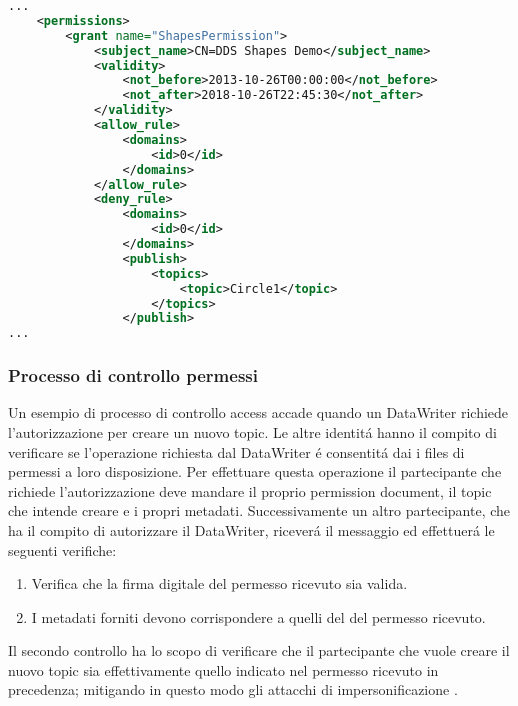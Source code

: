 \vspace{5mm} %
\begin{lstlisting}[language=XML, caption=Estratto di permissions
    document{,} tratto da documento di riferimento 
    del DDS Security versione 1.1 \cite{ddssecurity1.1}.
    , label=XML permission file,
    captionpos=b]
...
    <permissions>
        <grant name="ShapesPermission">
            <subject_name>CN=DDS Shapes Demo</subject_name>
            <validity>
                <not_before>2013-10-26T00:00:00</not_before>
                <not_after>2018-10-26T22:45:30</not_after>
            </validity>
            <allow_rule>
                <domains>
                    <id>0</id>
                </domains>
            </allow_rule>
            <deny_rule>
                <domains>
                    <id>0</id>
                </domains>
                <publish>
                    <topics>
                        <topic>Circle1</topic>
                    </topics>
                </publish>
...
    \end{lstlisting}
\vspace{5mm}

\subsubsection{Processo di controllo permessi}
Un esempio di processo di controllo access accade
quando un DataWriter richiede l'autorizzazione per creare un nuovo topic.
Le altre identitá hanno il compito di verificare se l'operazione 
richiesta dal DataWriter é consentitá
dai i files di permessi a loro disposizione. Per effettuare 
questa operazione il partecipante che richiede l'autorizzazione 
deve mandare il proprio permission document, il topic che intende creare e 
i propri metadati. Successivamente un altro partecipante,
che ha il compito di autorizzare il DataWriter,
riceverá il messaggio ed effettuerá le seguenti
verifiche:
\begin{enumerate}
    \item Verifica che la firma digitale del permesso ricevuto sia valida.
    \item I metadati forniti devono corrispondere a quelli del del 
    permesso ricevuto.
\end{enumerate}
Il secondo controllo ha lo scopo di verificare
che il partecipante che vuole creare il 
nuovo topic sia effettivamente quello indicato nel permesso 
ricevuto in precedenza; mitigando in questo modo gli attacchi di 
impersonificazione 
\cite{DBLP:conf/asiaccs/WangLG24}.
